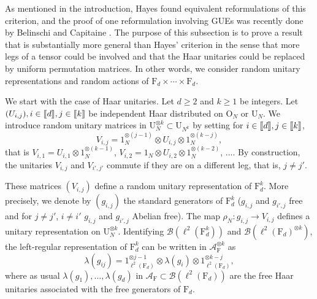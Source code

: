 \documentclass[11pt]{article}
\renewcommand{\star}{{\mathrm{F}}}
\newcommand{\cA}{\mathcal{A}}
\newcommand{\dF}{\mathrm{F}}
\newcommand{\dU}{\mathrm {U}}
\newcommand{\dO}{\mathrm{O}}
\newcommand{\cB}{\mathcal{B}}
\newcommand{\1}{1\!\!{\sf I}}
\newcommand{\INT}[1]{{{\left[\hspace{-1.4pt}\left[#1\right]\hspace{-1.4pt}\right]}}}
\begin{document}
As mentioned in the introduction, Hayes found equivalent reformulations of this criterion, and the proof of 
one reformulation involving GUEs was recently done by Belinschi and Capitaine \cite{belinschi2022strong}. The purpose of this subsection is to prove a result that is substantially more general than Hayes' criterion in the sense that more legs of a tensor could be involved and that the Haar unitaries could be replaced by uniform permutation matrices. In other words, we consider random unitary representations and random actions of $\dF_d \times \cdots \times \dF_d$.

We start with the case of Haar unitaries. Let $d \geq 2$ and $k \geq 1$ be integers.  Let $(U_{i,j}), i \in \INT{d}, j \in \INT{k}$ be independent Haar distributed on $\dO_N$ or $\dU_N$. We introduce random unitary matrices in $\dU_N^{\otimes k} \subset \dU_{N^k}$  by setting for $i \in \INT{d}, j \in \INT{k}$,
\begin{equation}\label{eq:Vij}
V_{i,j} = 1_N ^{\otimes(j-1)} \otimes U_{i,j} \otimes 1_N^{\otimes (k-j)},
\end{equation}
that is $V_{i,1} = U_{i,1} \otimes 1_N^{\otimes(k-1)}$, $V_{i,2} = 1_N \otimes U_{i,2} \otimes 1_N^{\otimes (k-2)}$, $\ldots$. By construction, the unitaries $V_{i,j}$ and $V_{i',j'}$ commute if they are on a different leg, that is, $j \ne j'$.

These matrices $(V_{i,j})$ define a random unitary representation of $\dF_d^k$. More precisely, we denote by $(g_{i,j})$ the standard generators of $\dF_d^k$ ($g_{i,j}$ and $g_{i',j}$ free and for $j\ne j'$, $i\ne i'$ $g_{i,j}$ and $g_{i',j}$ Abelian free). The map $\rho_N : g_{i,j} \to V_{i,j}$ defines a unitary representation on $\dU_{N}^{\otimes k}$. Identifying $ \cB(\ell^{2}(\dF^k_d))$ and $\cB(\ell^2(\dF_d)^{\otimes k})$, the left-regular representation of $\dF^k_d$ can be written in $\cA_\star^{\otimes k }$ as
$$
\lambda(g_{ij}) = 1_{\ell^2(\dF_d)}^{\otimes {j-1}} \otimes \lambda(g_i) \otimes 1_{\ell^2(\dF_d)}^{\otimes {k-j}}, 
$$
where as usual $\lambda(g_1), \ldots, \lambda(g_{d})$ in $\cA_\star \subset \cB(\ell^2(\dF_d))$ are the free Haar unitaries associated with the free generators of $\dF_d$. 
\end{document}
